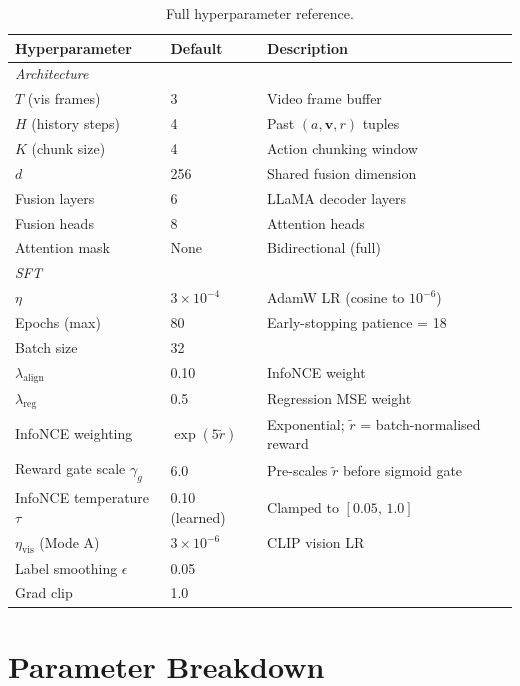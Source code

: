 \documentclass{article}
\begin{document}
\begin{table}[h]
\centering
\caption{Full hyperparameter reference.}
\label{tab:hparams}
\small
\begin{tabular}{lll}
\toprule
\textbf{Hyperparameter} & \textbf{Default} & \textbf{Description} \\
\midrule
\multicolumn{3}{l}{\textit{Architecture}} \\
$T$ (vis frames)        & 3     & Video frame buffer \\
$H$ (history steps)     & 4     & Past $(a,\mathbf{v},r)$ tuples \\
$K$ (chunk size)        & 4     & Action chunking window \\
$d$                     & 256   & Shared fusion dimension \\
Fusion layers           & 6     & LLaMA decoder layers \\
Fusion heads            & 8     & Attention heads \\
Attention mask          & None  & Bidirectional (full) \\
\midrule
\multicolumn{3}{l}{\textit{SFT}} \\
$\eta$                  & $3\!\times\!10^{-4}$ & AdamW LR (cosine to $10^{-6}$) \\
Epochs (max)            & 80    & Early-stopping patience = 18 \\
Batch size              & 32    & \\
$\lambda_\mathrm{align}$& 0.10  & InfoNCE weight \\
$\lambda_\mathrm{reg}$  & 0.5   & Regression MSE weight \\
InfoNCE weighting       & $\exp(5\tilde{r})$ & Exponential; $\tilde{r}$ = batch-normalised reward \\
Reward gate scale $\gamma_g$ & 6.0 & Pre-scales $\tilde{r}$ before sigmoid gate \\
InfoNCE temperature $\tau$ & 0.10 (learned) & Clamped to $[0.05,\,1.0]$ \\
$\eta_\mathrm{vis}$ (Mode A) & $3\!\times\!10^{-6}$ & CLIP vision LR \\
Label smoothing $\epsilon$ & 0.05 & \\
Grad clip               & 1.0   & \\
\bottomrule
\end{tabular}
\end{table}

\section{Parameter Breakdown}
\label{app:params}
\end{document}
